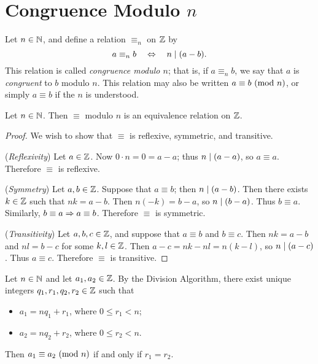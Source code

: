 \documentclass{amsart}
\begin{document}
\newpage

\section{Congruence Modulo $n$}

\begin{Def}
Let $n \in \mathbb{N}$, and define a relation $\equiv_{n}$ on $\mathbb{Z}$ by
\[ a \equiv_n b \quad \Leftrightarrow \quad n \mid (a-b) . \]
This relation is called {\em congruence modulo $n$};
that is, if $a \equiv_n b$, we say that $a$ is {\em congruent}
to $b$ modulo $n$.
This relation may also be written $a \equiv b \text{\rm{ (mod }}{n}\text{\rm{)}}$, or simply $a \equiv b$
if the $n$ is understood.
\end{Def}

\begin{Prop}
Let $n \in \mathbb{N}$. Then $\equiv$ modulo $n$ is an equivalence relation on $\mathbb{Z}$.
\end{Prop}

\begin{proof}
We wish to show that $\equiv$ is reflexive, symmetric, and transitive.

({\em Reflexivity}) Let $a \in \mathbb{Z}$. Now $0 \cdot n = 0 = a-a$; thus
$n \mid (a-a)$, so $a \equiv a$. Therefore $\equiv$ is
reflexive.

({\em Symmetry}) Let $a,b \in \mathbb{Z}$. Suppose that $a \equiv b$; then
$n \mid (a-b)$. Then there exists $k \in \mathbb{Z}$ such that $nk =
a-b$. Then $n(-k) = b-a$, so $n \mid (b-a)$. Thus $b \equiv a$.
Similarly, $b \equiv a \Rightarrow a \equiv b$. Therefore $\equiv$ is
symmetric.

({\em Transitivity}) Let $a,b,c \in \mathbb{Z}$, and suppose that $a \equiv
b$ and $b \equiv c$. Then $nk = a-b$ and $nl = b-c$ for some $k,l
\in \mathbb{Z}$. Then $a-c = nk - nl = n(k-l)$, so $n \mid (a-c)$. Thus
$a \equiv c$. Therefore $\equiv$ is transitive.
\end{proof}

\begin{Prop} \label{UniquePreferred}
Let $n \in \mathbb{N}$ and let $a_{1},a_{2} \in \mathbb{Z}$. By the Division
Algorithm, there exist unique integers $q_{1},r_{1},q_{2},r_{2} \in
\mathbb{Z}$ such that
\begin{itemize}
\item $a_{1} = nq_{1} + r_{1}$, where $0 \le r_{1} < n$;
\item $a_{2} = nq_{2} + r_{2}$, where $0 \le r_{2} < n$.
\end{itemize}
Then $a_{1} \equiv a_{2} \text{\rm{ (mod }}{n}\text{\rm{)}}$ if and only if $r_{1} = r_{2}$.
\end{Prop}
\end{document}
